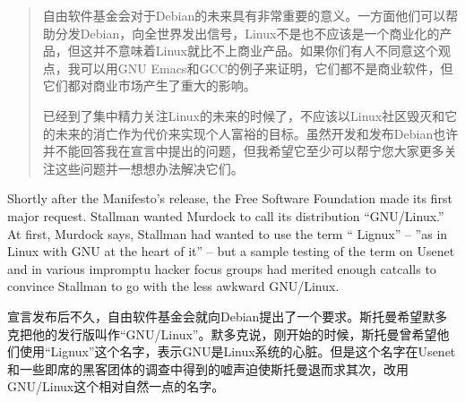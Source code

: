 \ifdefined\chs
\begin{quote}
自由软件基金会对于Debian的未来具有非常重要的意义。一方面他们可以帮助分发Debian，向全世界发出信号，Linux不是也不应该是一个商业化的产品，但这并不意味着Linux就比不上商业产品。如果你们有人不同意这个观点，我可以用GNU Emacs和GCC的例子来证明，它们都不是商业软件，但它们都对商业市场产生了重大的影响。

已经到了集中精力关注Linux的未来的时候了，不应该以Linux社区毁灭和它的未来的消亡作为代价来实现个人富裕的目标。虽然开发和发布Debian也许并不能回答我在宣言中提出的问题，但我希望它至少可以帮宁您大家更多关注这些问题并一想想办法解决它们。
\end{quote}
\fi

\ifdefined\eng
Shortly after the Manifesto's release, the Free Software Foundation made its first major request. Stallman wanted Murdock to call its distribution ``GNU/Linux.'' At first, Murdock says, Stallman had wanted to use the term `` Lignux'' -- ''as in Linux with GNU at the heart of it'' -- but a sample testing of the term on Usenet and in various impromptu hacker focus groups had merited enough catcalls to convince Stallman to go with the less awkward GNU/Linux.
\fi

\ifdefined\chs
宣言发布后不久，自由软件基金会就向Debian提出了一个要求。斯托曼希望默多克把他的发行版叫作``GNU/Linux''。默多克说，刚开始的时候，斯托曼曾希望他们使用``Lignux''这个名字，表示GNU是Linux系统的心脏。但是这个名字在Usenet和一些即席的黑客团体的调查中得到的嘘声迫使斯托曼退而求其次，改用GNU/Linux这个相对自然一点的名字。
\fi


